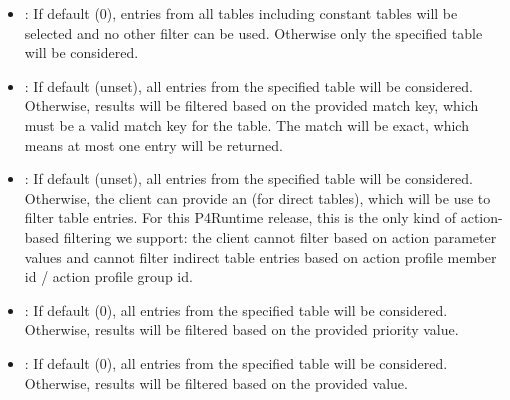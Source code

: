 \documentclass[11pt]{article}
\begin{document}
{%
\begin{itemize}[noitemsep,topsep=\mdcompacttopsep]%

\item{}: If default (0), entries from all tables \textemdash{} including constant
tables \textemdash{} will be selected and no other filter can be used. Otherwise only
the specified table will be considered.%

\item{}: If default (unset), all entries from the specified table will be
considered. Otherwise, results will be filtered based on the provided match
key, which must be a valid match key for the table. The match will be exact,
which means at most one entry will be returned.%

\item{}: If default (unset), all entries from the specified table will be
considered. Otherwise, the client can provide an  (for direct
tables), which will be use to filter table entries. For this P4Runtime
release, this is the only kind of action-based filtering we support: the
client cannot filter based on action parameter values and cannot filter
indirect table entries based on action profile member id / action profile
group id.%

\item{}: If default (0), all entries from the specified table will be
considered. Otherwise, results will be filtered based on the provided priority
value.%

\item{}: If default (0), all entries from the specified table
will be considered. Otherwise, results will be filtered based on the provided
 value.%


\end{itemize}}
\end{document}
